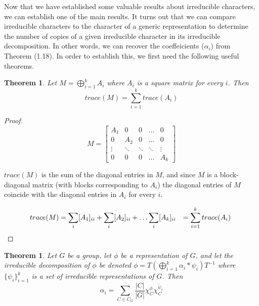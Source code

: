 \documentclass[10pt]{ucthesis}
\newtheorem{theorem}[definition]{Theorem}
\begin{document}
Now that we have established some valuable results about irreducible characters, we can establish one of the main results. It turns out that we can compare irreducible characters to the character of a generic representation to determine the number of copies of a given irreducible character in its irreducible decomposition. In other words, we can recover the coeffeicients ($\alpha_i$) from Theorem (1.18). In order to establish this, we first need the following useful theorems.

\begin{theorem}
	Let $M = \bigoplus_{i=1}^k A_i$ where $A_i$ is a square matrix for every $i$. Then $$trace(M) = \sum_{i=1}^k trace(A_i)$$
\end{theorem} 

\noindent \begin{proof} $$M = \begin{bmatrix}
						A_1 & 0 & 0 & \hdots & 0 \\
						0 & A_2 & 0 & \hdots & 0 \\
						\vdots & \ddots & \ddots & \ddots & \vdots \\
						0 & 0 & 0 & \hdots & A_k
					\end{bmatrix}$$

$trace(M)$ is the sum of the diagonal entries in $M$, and since $M$ is a block-diagonal matrix (with blocks corresponding to $A_i$) the diagonal entries of $M$ coincide with the diagonal entries in $A_i$ for every $i$.

\begin{equation}
	\begin{aligned}
		trace(M) &= \sum_i [A_1]_{ii} + \sum_i [A_2]_{ii} + \hdots \sum_i [A_k]_{ii} &= \sum_{i=1}^k trace(A_i) \hspace{1mm}
	\end{aligned}
\end{equation}
\end{proof}

\begin{theorem}
	Let $G$ be a group, let $\phi$ be a representation of $G$, and let the irreducible decomposition of $\phi$ be denoted $\phi = T \left( \bigoplus_{i=1}^k \alpha_i *\psi_i\right) T^{-1}$ where $\{\psi_i\}_{i=1}^k$ is a set of irreducible representations of $G$. Then $$\alpha_i = \sum_{C\in C_G} \frac{|C|}{|G|}\chi^\phi_C \overline{\chi^{\psi_i}_C}$$
\end{theorem}
\end{document}
